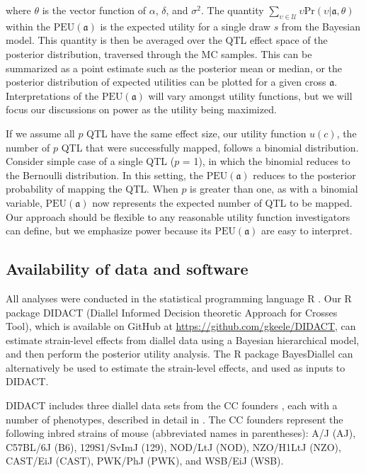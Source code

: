 where $\theta$ is the vector function of $\alpha$, $\delta$, and $\sigma^{2}$. The quantity $\sum_{\upsilon \in \mathcal{U}}\upsilon\text{Pr}(\upsilon|\mathfrak{a}, \theta)$ within the $\text{PEU}(\mathfrak{a})$ is the expected utility for a single draw $s$ from the Bayesian model. This quantity is then be averaged over the QTL effect space of the posterior distribution, traversed through the MC samples. This can be summarized as a point estimate such as the posterior mean or median, or the posterior distribution of expected utilities can be plotted for a given cross $\mathfrak{a}$. Interpretations of the $\text{PEU}(\mathfrak{a})$ will vary amongst utility functions, but we will focus our discussions on power as the utility being maximized.

If we assume all $p$ QTL have the same effect size, our utility function $u(c)$, the number of $p$ QTL that were successfully mapped, follows a binomial distribution. Consider simple case of a single QTL ($p$ = 1), in which the binomial reduces to the Bernoulli distribution. In this setting, the $\text{PEU}(\mathfrak{a})$ reduces to the posterior probability of mapping the QTL. When $p$ is greater than one, as with a binomial variable, $\text{PEU}(\mathfrak{a})$ now represents the expected number of QTL to be mapped. Our approach should be flexible to any reasonable utility function investigators can define, but we emphasize power because its $\text{PEU}(\mathfrak{a})$ are easy to interpret.

\subsection{Availability of data and software}

All analyses were conducted in the statistical programming language R \citep{RSoftware2018}. Our R package DIDACT (Diallel Informed Decision theoretic Approach for Crosses Tool), which is available on GitHub at \url{https://github.com/gkeele/DIDACT}, can estimate strain-level effects from diallel data using a Bayesian hierarchical model, and then perform the posterior utility analysis. The R package BayesDiallel can alternatively be used to estimate the strain-level effects, and used as inputs to DIDACT.

DIDACT includes three diallel data sets from the CC founders \citep{Churchill2004,Hall2012,Srivastava2017}, each with a number of phenotypes, described in detail in \cite{Lenarcic2012}. The CC founders represent the following inbred strains of mouse (abbreviated names in parentheses): A/J (AJ), C57BL/6J (B6), 129S1/SvImJ (129), NOD/LtJ (NOD), NZO/H1LtJ (NZO), CAST/EiJ (CAST), PWK/PhJ (PWK), and WSB/EiJ (WSB).

